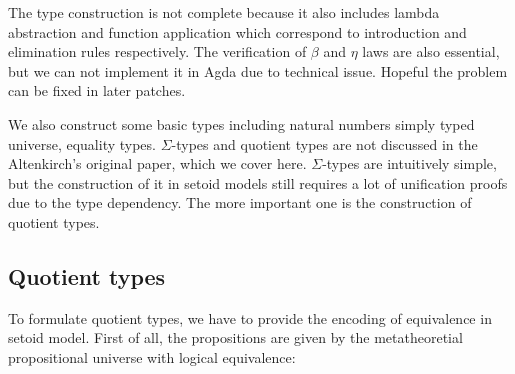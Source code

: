 The type construction is not complete because it also includes lambda abstraction and function application which correspond to introduction and elimination rules respectively. The verification of $\beta$ and $\eta$ laws are also essential, but we can not implement it in Agda due to technical issue. Hopeful the problem can be fixed in later patches.

We also construct some basic types including natural numbers simply typed universe, equality types. $\Sigma$-types and quotient types are not discussed in the Altenkirch's original paper, which we cover here. $\Sigma$-types are intuitively simple, but the construction of it in setoid models still requires a lot of unification proofs due to the type dependency. The more important one is the construction of quotient types.


\subsection{Quotient types}

To formulate quotient types, we have to provide the encoding of equivalence in setoid model. First of all, the propositions are given by the metatheoretial propositional universe with logical equivalence:

